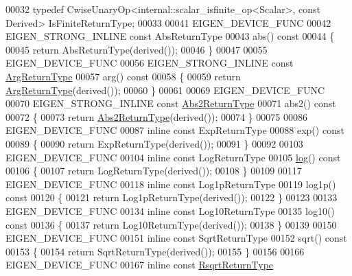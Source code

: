 \begin{DoxyCode}
00032 \textcolor{keyword}{typedef} CwiseUnaryOp<internal::scalar\_isfinite\_op<Scalar>, \textcolor{keyword}{const} Derived> IsFiniteReturnType;
00033 
00041 EIGEN\_DEVICE\_FUNC
00042 EIGEN\_STRONG\_INLINE \textcolor{keyword}{const} AbsReturnType
00043 abs()\textcolor{keyword}{ const}
00044 \textcolor{keyword}{}\{
00045   \textcolor{keywordflow}{return} AbsReturnType(derived());
00046 \}
00047 
00055 EIGEN\_DEVICE\_FUNC
00056 EIGEN\_STRONG\_INLINE \textcolor{keyword}{const} \hyperlink{group___core___module_class_eigen_1_1_cwise_unary_op}{ArgReturnType}
00057 arg()\textcolor{keyword}{ const}
00058 \textcolor{keyword}{}\{
00059   \textcolor{keywordflow}{return} \hyperlink{group___core___module_class_eigen_1_1_cwise_unary_op}{ArgReturnType}(derived());
00060 \}
00061 
00069 EIGEN\_DEVICE\_FUNC
00070 EIGEN\_STRONG\_INLINE \textcolor{keyword}{const} \hyperlink{group___core___module_class_eigen_1_1_cwise_unary_op}{Abs2ReturnType}
00071 abs2()\textcolor{keyword}{ const}
00072 \textcolor{keyword}{}\{
00073   \textcolor{keywordflow}{return} \hyperlink{group___core___module_class_eigen_1_1_cwise_unary_op}{Abs2ReturnType}(derived());
00074 \}
00075 
00086 EIGEN\_DEVICE\_FUNC
00087 \textcolor{keyword}{inline} \textcolor{keyword}{const} ExpReturnType
00088 exp()\textcolor{keyword}{ const}
00089 \textcolor{keyword}{}\{
00090   \textcolor{keywordflow}{return} ExpReturnType(derived());
00091 \}
00092 
00103 EIGEN\_DEVICE\_FUNC
00104 \textcolor{keyword}{inline} \textcolor{keyword}{const} LogReturnType
00105 \hyperlink{structlog}{log}()\textcolor{keyword}{ const}
00106 \textcolor{keyword}{}\{
00107   \textcolor{keywordflow}{return} LogReturnType(derived());
00108 \}
00109 
00117 EIGEN\_DEVICE\_FUNC
00118 \textcolor{keyword}{inline} \textcolor{keyword}{const} Log1pReturnType
00119 log1p()\textcolor{keyword}{ const}
00120 \textcolor{keyword}{}\{
00121   \textcolor{keywordflow}{return} Log1pReturnType(derived());
00122 \}
00123 
00133 EIGEN\_DEVICE\_FUNC
00134 \textcolor{keyword}{inline} \textcolor{keyword}{const} Log10ReturnType
00135 log10()\textcolor{keyword}{ const}
00136 \textcolor{keyword}{}\{
00137   \textcolor{keywordflow}{return} Log10ReturnType(derived());
00138 \}
00139 
00150 EIGEN\_DEVICE\_FUNC
00151 \textcolor{keyword}{inline} \textcolor{keyword}{const} SqrtReturnType
00152 sqrt()\textcolor{keyword}{ const}
00153 \textcolor{keyword}{}\{
00154   \textcolor{keywordflow}{return} SqrtReturnType(derived());
00155 \}
00156 
00166 EIGEN\_DEVICE\_FUNC
00167 \textcolor{keyword}{inline} \textcolor{keyword}{const} \hyperlink{group___core___module_class_eigen_1_1_cwise_unary_op}{RsqrtReturnType}

\end{DoxyCode}
